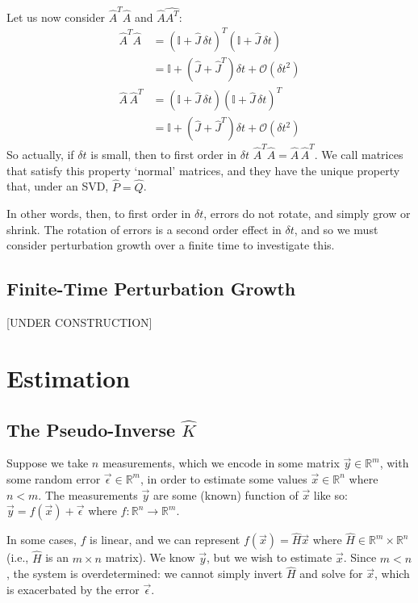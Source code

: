Let us now consider $\hat{A}^T\hat{A}$ and $\hat{A}\hat{A^T}$:
\begin{align*}
    \hat{A}^T\hat{A} &= (\mathbb{I}+\hat{J}\,\delta t)^T(\mathbb{I}+\hat{J}\,\delta t)
    \\
    &= \mathbb{I} + (\hat{J}+\hat{J}^T)\delta t + \mathcal{O}\left( \delta t^2 \right)
    \\
    \hat{A}\,\hat{A}^T
    &=
    (\mathbb{I}+\hat{J}\,\delta t)(\mathbb{I}+\hat{J}\,\delta t)^T
    \\
    &= \mathbb{I} + (\hat{J}+\hat{J}^T)\delta t + \mathcal{O}\left( \delta t^2 \right)
\end{align*}
So actually, if $\delta t$ is small, then to first order in $\delta t$ $\hat{A}^T\hat{A}=\hat{A}\,\hat{A}^T$. We call matrices that satisfy this property `normal' matrices, and they have the unique property that, under an SVD, $\hat{P}=\hat{Q}$.

In other words, then, to first order in $\delta t$, errors do not rotate, and simply grow or shrink. The rotation of errors is a second order effect in $\delta t$, and so we must consider perturbation growth over a finite time to investigate this.

\section{Finite-Time Perturbation Growth}

[UNDER CONSTRUCTION]

\chapter{Estimation}\label{Estimation}

\section{The Pseudo-Inverse \texorpdfstring{$\hat{K}$}{K-hat}}

Suppose we take $n$ measurements, which we encode in some matrix $\vec{y}\in\mathbb{R}^m$, with some random error $\vec{\epsilon}\in\mathbb{R}^m$, in order to estimate some values $\vec{x}\in\mathbb{R}^n$ where $n<m$. The measurements $\vec{y}$ are some (known) function of $\vec{x}$ like so: $\vec{y}=f(\vec{x})+\vec{\epsilon}$ where $f:\mathbb{R}^n\to\mathbb{R}^m$.

In some cases, $f$ is linear, and we can represent $f(\vec{x})=\hat{H}\vec{x}$ where $\hat{H}\in\mathbb{R}^m\times\mathbb{R}^n$ (i.e., $\hat{H}$ is an $m\times n$ matrix). We know $\vec{y}$, but we wish to estimate $\vec{x}$. Since $m<n$, the system is overdetermined: we cannot simply invert $\hat{H}$ and solve for $\vec{x}$, which is exacerbated by the error $\vec{\epsilon}$.

